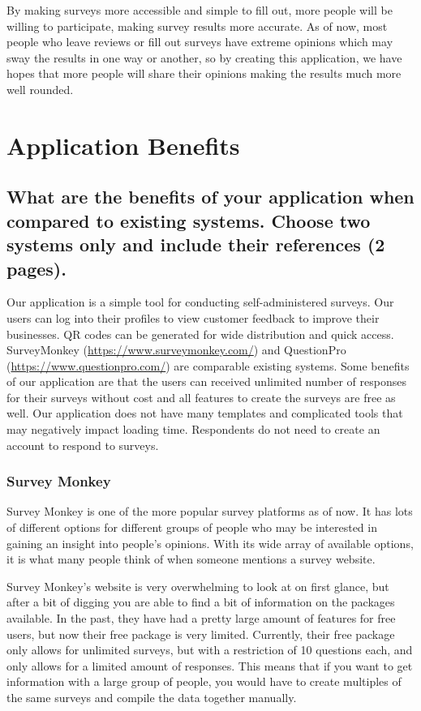 \documentclass[letterpaper, 12 pt, conference]{ieeeconf}
\begin{document}
By making surveys more accessible and simple to fill out, more people will be willing to participate, making survey results more accurate. As of now, most people who leave reviews or fill out surveys have extreme opinions which may sway the results in one way or another, so by creating this application, we have hopes that more people will share their opinions making the results much more well rounded.


\newpage    
\section{Application Benefits}
\subsection{What are the benefits of your application when compared to existing systems. Choose two systems only and include their references (2 pages).}
\linebreak
Our application is a simple tool for conducting self-administered surveys. Our users can log into their profiles to view customer feedback to improve their businesses. QR codes can be generated for wide distribution and quick access. SurveyMonkey (\url{https://www.surveymonkey.com/}) and QuestionPro (\url{https://www.questionpro.com/}) are comparable existing systems. Some benefits of our application are that the users can received unlimited number of responses for their surveys without cost and all features to create the surveys are free as well. Our application does not have many templates and complicated tools that may negatively impact loading time. Respondents do not need to create an account to respond to surveys. 

\hfill 

\subsubsection*{Survey Monkey}\hfill 

Survey Monkey is one of the more popular survey platforms as of now. It has lots of different options for different groups of people who may be interested in gaining an insight into people's opinions. With its wide array of available options, it is what many people think of when someone mentions a survey website.
\newline

Survey Monkey's website is very overwhelming to look at on first glance, but after a bit of digging you are able to find a bit of information on the packages available. In the past, they have had a pretty large amount of features for free users, but now their free package is very limited. Currently, their free package only allows for unlimited surveys, but with a restriction of 10 questions each, and only allows for a limited amount of responses. This means that if you want to get information with a large group of people, you would have to create multiples of the same surveys and compile the data together manually.
\newline
\end{document}
